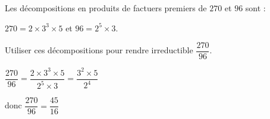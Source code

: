 \begin{exercice*}
    Les décompositions en produits de factuers premiers de $270$ et $96$ sont :

    $270=2\times 3^3\times 5$ et $96=2^5\times 3$.

    Utiliser ces décompositions pour rendre irreductible $\dfrac{270}{96}$.
\end{exercice*}
\begin{corrige}

    $\dfrac{270}{96} = \dfrac{2\times 3^3\times 5}{2^5\times 3}=\dfrac{3^2\times 5}{2^4}$

    donc $\dfrac{270}{96} = \dfrac{45}{16}$
\end{corrige}

